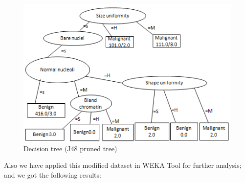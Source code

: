 \documentclass[conference]{IEEEtran}
\begin{document}
%



\begin{figure}[!h]
\centering
\includegraphics[scale=0.5]{treenew}
\caption{Decision tree (J48 pruned tree)}
\label{fig_tree}
\end{figure}


Also we have applied this modified dataset in WEKA Tool for further analysis; and we got the following results:
\end{document}

